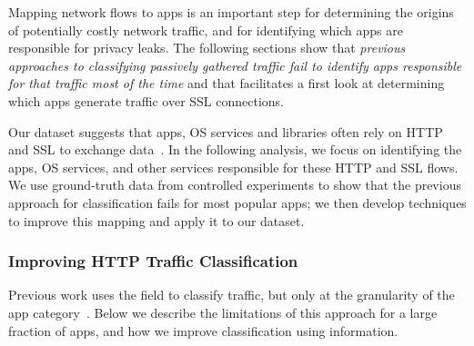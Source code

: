 Mapping network flows to apps is an important step for determining the origins of potentially costly 
network traffic, and for identifying which apps are responsible for privacy leaks. The following 
sections show that  \emph{previous approaches to classifying passively gathered traffic fail to identify
apps responsible for that traffic most of the time} and that \platname{} facilitates a first look at 
determining which apps generate traffic over SSL connections.





Our \mobWild dataset suggests that apps, OS services and libraries often rely on HTTP and SSL to exchange data~\cite{maier:mobtraffic,falaki:mobileusage,xu:appusage}.
In the following analysis, we focus on identifying the apps, OS services, and other services responsible for these HTTP and SSL flows. 
We use ground-truth data from controlled experiments to show that the previous approach for classification fails 
for most popular apps; we then develop techniques to improve this mapping and apply it to our \mobWild dataset. 

\subsubsection{Improving HTTP Traffic Classification}

Previous work uses the \useragent field to classify traffic, but only at the granularity of the app category~\cite{erman2011http,xu:appusage,maier:mobtraffic}. 
Below we describe the limitations of this approach for a large fraction of apps, and how we improve classification using \httphost information.  

